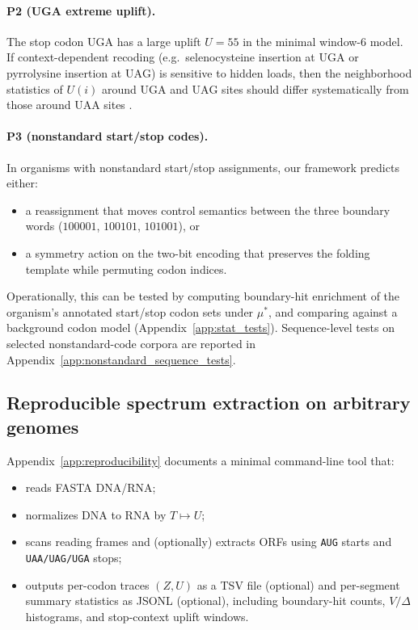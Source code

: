 \paragraph{P2 (UGA extreme uplift).}
The stop codon $\mathrm{UGA}$ has a large uplift $U=55$ in the minimal window-$6$ model.
If context-dependent recoding (e.g.\ selenocysteine insertion at $\mathrm{UGA}$ or pyrrolysine insertion at $\mathrm{UAG}$) is sensitive to hidden loads, then the neighborhood statistics of $U(i)$ around $\mathrm{UGA}$ and $\mathrm{UAG}$ sites should differ systematically from those around $\mathrm{UAA}$ sites \cite{HatfieldGladyshev2002,SrinivasanJamesKrzycki2002,McCaughanBrownDalphinBerryTate1995}.

\paragraph{P3 (nonstandard start/stop codes).}
In organisms with nonstandard start/stop assignments, our framework predicts either:
\begin{itemize}
\item a reassignment that moves control semantics between the three boundary words ($100001$, $100101$, $101001$), or
\item a symmetry action on the two-bit encoding that preserves the folding template while permuting codon indices.
\end{itemize}
Operationally, this can be tested by computing boundary-hit enrichment of the organism's annotated start/stop codon sets under $\mu^\ast$, and comparing against a background codon model (Appendix~\ref{app:stat_tests}).
Sequence-level tests on selected nonstandard-code corpora are reported in Appendix~\ref{app:nonstandard_sequence_tests}.

\subsection{Reproducible spectrum extraction on arbitrary genomes}
\label{sec:reproducible_pipeline}

Appendix~\ref{app:reproducibility} documents a minimal command-line tool that:
\begin{itemize}
\item reads FASTA DNA/RNA;
\item normalizes DNA to RNA by $T\mapsto U$;
\item scans reading frames and (optionally) extracts ORFs using \texttt{AUG} starts and \texttt{UAA/UAG/UGA} stops;
\item outputs per-codon traces $(Z,U)$ as a TSV file (optional) and per-segment summary statistics as JSONL (optional), including boundary-hit counts, $V/\Delta$ histograms, and stop-context uplift windows.
\end{itemize}

